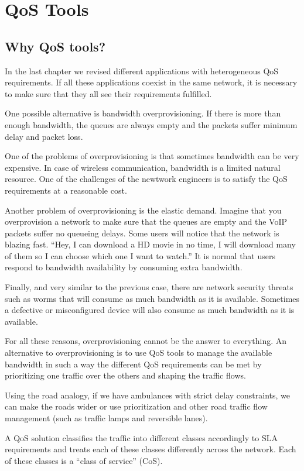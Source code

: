 \chapter{QoS Tools}
\section{Why QoS tools?}
In the last chapter we revised different applications with heterogeneous QoS requirements.
If all these applications coexist in the same network, it is necessary to make sure that they all see their requirements fulfilled.

One possible alternative is bandwidth overprovisioning.
If there is more than enough bandwidth, the queues are always empty and the packets suffer minimum delay and packet loss.

One of the problems of overprovisioning is that sometimes bandwidth can be very expensive.
In case of wireless communication, bandwidth is a limited natural resource.
One of the challenges of the newtwork engineers is to satisfy the QoS requirements at a reasonable cost.

Another problem of overprovisioning is the elastic demand.
Imagine that you overprovision a network to make sure that the queues are empty and the VoIP packets suffer no queueing delays.
Some users will notice that the network is blazing fast.
``Hey, I can download a HD movie in no time, I will download many of them so I can choose which one I want to watch.''
It is normal that users respond to bandwidth availability by consuming extra bandwidth.

Finally, and very similar to the previous case, there are network security threats such as worms that will consume as much bandwidth as it is available.
Sometimes a defective or misconfigured device will also consume as much bandwidth as it is available.

For all these reasons, overprovisioning cannot be the answer to everything.
An alternative to overprovisioning is to use QoS tools to manage the available bandwidth in such a way the different QoS requirements can be met by prioritizing one traffic over the others and shaping the traffic flows.

Using the road analogy, if we have ambulances with strict delay constraints, we can make the roads wider or use prioritization and other road traffic flow management (such as traffic lamps and reversible lanes).

A QoS solution classifies the traffic into different classes accordingly to SLA requirements and treats each of these classes differently across the network.
Each of these classes is a ``class of service'' (CoS).

